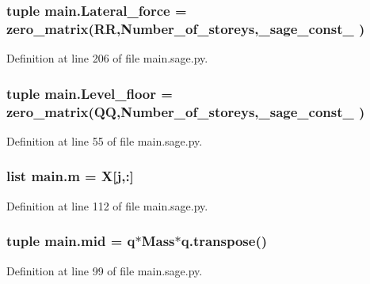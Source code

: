 \subsubsection[{Lateral\+\_\+force}]{\setlength{\rightskip}{0pt plus 5cm}tuple main.\+Lateral\+\_\+force = zero\+\_\+matrix(R\+R,Number\+\_\+of\+\_\+storeys,\+\_\+sage\+\_\+const\+\_ )}\label{namespacemain_a712447a841ce148ad2d1210e57dc7894}


Definition at line 206 of file main.\+sage.\+py.

\hypertarget{namespacemain_ad7b051da0e829aff37fef1e171e37fa3}{}
\subsubsection[{Level\+\_\+floor}]{\setlength{\rightskip}{0pt plus 5cm}tuple main.\+Level\+\_\+floor = zero\+\_\+matrix(Q\+Q,Number\+\_\+of\+\_\+storeys,\+\_\+sage\+\_\+const\+\_ )}\label{namespacemain_ad7b051da0e829aff37fef1e171e37fa3}


Definition at line 55 of file main.\+sage.\+py.

\hypertarget{namespacemain_af6e3698b7f50fc004eb759d7c447fdb3}{}
\subsubsection[{m}]{\setlength{\rightskip}{0pt plus 5cm}list main.\+m = {\bf X}\mbox{[}{\bf j},\+:\mbox{]}}\label{namespacemain_af6e3698b7f50fc004eb759d7c447fdb3}


Definition at line 112 of file main.\+sage.\+py.

\hypertarget{namespacemain_a70551c7fc78da8fdec83fe500056d388}{}
\subsubsection[{mid}]{\setlength{\rightskip}{0pt plus 5cm}tuple main.\+mid = {\bf q}$\ast$Mass$\ast$q.\+transpose()}\label{namespacemain_a70551c7fc78da8fdec83fe500056d388}


Definition at line 99 of file main.\+sage.\+py.

\hypertarget{namespacemain_ab273c2ae46514d6ec3d905c30cbb5a1b}{}
